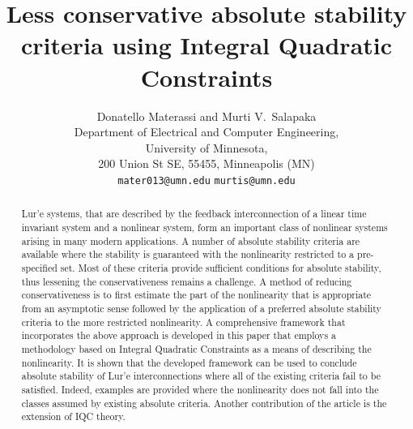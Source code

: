 \documentclass[letterpaper,10pt,conference,twocolumn]{IEEEtran}
\title{Less conservative absolute stability criteria using Integral Quadratic Constraints}
\author{
	Donatello Materassi\IEEEauthorrefmark{1} and
	Murti V.~Salapaka\IEEEauthorrefmark{7} \medskip\\
		Department of Electrical and Computer Engineering,\\
		University of Minnesota,\\
		200 Union St SE, 55455, Minneapolis (MN) \\
	\IEEEauthorrefmark{1}
		{\tt\small mater013@umn.edu} \medskip \qquad
	\IEEEauthorrefmark{7}
		{\tt\small murtis@umn.edu}
}
\begin{document}
\maketitle
\thispagestyle{empty}
\pagestyle{empty}

\begin{abstract}
Lur'e systems, that are described by the feedback interconnection of a linear time invariant system and a nonlinear system, form an important class of nonlinear systems arising in many modern applications. A number of absolute stability criteria are available where the stability is guaranteed with the nonlinearity restricted to a pre-specified set.
Most of these criteria provide sufficient conditions for absolute stability, thus  lessening the conservativeness remains a challenge.
A method of reducing conservativeness is to first estimate the part of the nonlinearity that is appropriate from an asymptotic sense followed by the application of  a preferred absolute stability criteria to the more restricted nonlinearity. A comprehensive  framework that incorporates the above approach is developed in this paper that employs a methodology based on Integral Quadratic Constraints as a means of  describing  the nonlinearity.
It is shown that the developed framework can be used to conclude absolute stability of Lur'e interconnections where all of the existing criteria fail to be satisfied. Indeed, examples are provided where the nonlinearity does not fall into the classes assumed by existing absolute criteria. Another contribution of the article is the extension of IQC theory.
\end{abstract}
\end{document}
